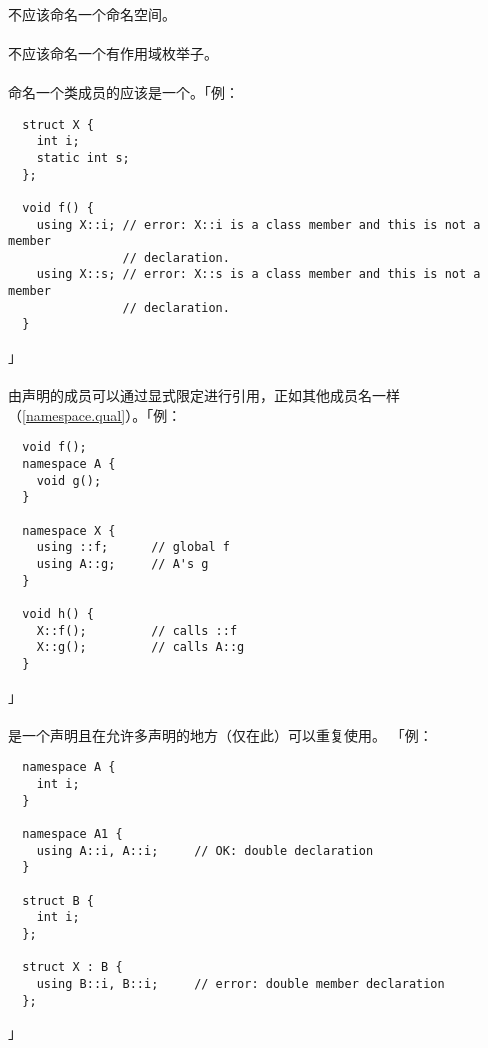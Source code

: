 \paragraph{}
不应该命名一个命名空间。

\paragraph{}
不应该命名一个有作用域枚举子。

\paragraph{}
命名一个类成员的应该是一个。「例：
\begin{lstlisting}
  struct X {
    int i;
    static int s;
  };

  void f() {
    using X::i; // error: X::i is a class member and this is not a member
                // declaration.
    using X::s; // error: X::s is a class member and this is not a member
                // declaration.
  }
\end{lstlisting}」

\paragraph{}
由声明的成员可以通过显式限定进行引用，正如其他成员名一样
（\ref{namespace.qual}）。「例：
\begin{lstlisting}
  void f();
  namespace A {
    void g();
  }

  namespace X {
    using ::f;      // global f
    using A::g;     // A's g
  }

  void h() {
    X::f();         // calls ::f
    X::g();         // calls A::g
  }
\end{lstlisting}」

\paragraph{}
是一个声明且在允许多声明的地方（仅在此）可以重复使用。
「例：
\begin{lstlisting}
  namespace A {
    int i;
  }

  namespace A1 {
    using A::i, A::i;     // OK: double declaration
  }

  struct B {
    int i;
  };

  struct X : B {
    using B::i, B::i;     // error: double member declaration
  };
\end{lstlisting}」

